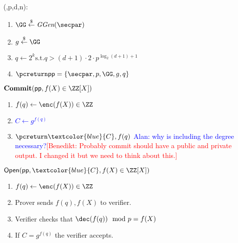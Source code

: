 \documentclass{article}
\theoremstyle{definition}
\newcommand{\benedikt}[1]{{\textcolor{red}{[Benedikt: #1]}}}
\newcommand{\benedikt}[1]{}
\begin{document}
\begin{mdframed}[userdefinedwidth=0.8\textwidth]
\begin{minipage}{\textwidth}
	\begin{flushleft}
	\setup(\secpar,p,d,n):
		\begin{enumerate}[nolistsep]
			\item $ \GG \sample \ggen(\secpar)$
			\item $ g \sample \GG$
			\item $q\gets 2^k \text{s.t.} q>(d+1) \cdot 2\cdot p^{\log_2(d+1)+1} $
			\item $\pcreturn \crs=\{\secpar,p,\GG,g,q\}$
		\end{enumerate}
		$\commit(\crs,f(X)\in \ZZ[X])$  
		\begin{enumerate}[nolistsep]
			\item 	$f(q)\gets \enc(f(X)) \in \ZZ$
			\item \textcolor{blue}{$C \gets g^{f(q)}$}
			\item $\pcreturn \textcolor{blue}{C},f(q)$ \textcolor{blue}{Alan: why is including the degree necessary?}\benedikt{Probably commit should have a public and private output. I changed it but we need to think about this.}
		\end{enumerate}
		$\open(\crs,\textcolor{blue}{C},f(X)\in \ZZ[X])$ \pccomment{\textcolor{blue}{$f(X)$'s coefficients are in $[-q/2,q/2]$}} 
		\begin{enumerate}[nolistsep]
			\item $f(q)\gets \enc(f(X)) \in \ZZ$
			\item Prover sends $f(q),f(X)$ to verifier.
			\item Verifier checks that $\dec(f(q)) \mod p=f(X)$
			\item If $C=g^{f(q)}$ the verifier accepts.
		\end{enumerate}
	\end{flushleft}
	
\end{minipage}
\end{mdframed}
\end{document}
